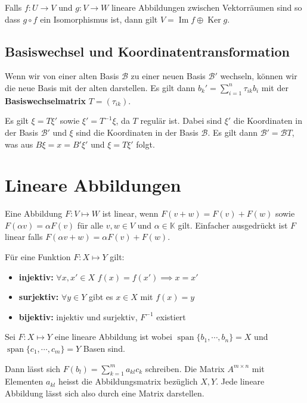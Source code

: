 \documentclass[a4paper,10pt]{article}
\DeclareMathOperator{\Span}{span}
\def\K{\mathbb{K}}
\begin{document}
Falls  $f: U \rightarrow V$ und $g: V \rightarrow W$ lineare Abbildungen zwischen Vektorräumen sind so dass $ g \circ f$ ein Isomorphismus ist, dann gilt $V = \operatorname{Im}f \oplus \operatorname{Ker} g$.

\subsection{Basiswechsel und Koordinatentransformation}

Wenn wir von einer alten Basis $\mathcal{B}$ zu einer neuen Basis $\mathcal{B}'$ wechseln, können wir die neue Basis mit der alten darstellen. Es gilt dann $b_k' = \sum_{i=1}^n \tau_{ik} b_i$ mit der \textbf{Basiswechselmatrix} $T = (\tau_{ik})$.

Es gilt $\xi = T \xi'$ sowie $\xi' = T^{-1} \xi$, da $T$ regulär ist. Dabei sind $\xi'$ die Koordinaten in der Basis $\mathcal{B}'$ und $\xi$ sind die Koordinaten in der Basis $\mathcal{B}$. Es gilt dann $\mathcal{B}' = \mathcal{B} T$, was aus $B \xi = x = B' \xi'$ und $\xi = T \xi'$ folgt.

\section{Lineare Abbildungen}

Eine Abbildung $F: V \mapsto W$ ist linear, wenn $F(v + w) = F(v) + F(w)$ sowie $F(\alpha v) = \alpha F(v)$ für alle $v, w \in V$ und $\alpha \in \K$ gilt. Einfacher ausgedrückt ist $F$ linear falls $F(\alpha v + w) = \alpha F(v) + F(w)$. 

Für eine Funktion $F: X \mapsto Y$ gilt:
\begin{itemize}
  \item \textbf{injektiv:} $\forall x, x' \in X$ $f(x) = f(x') \implies x = x'$
  \item \textbf{surjektiv:} $\forall y \in Y$ gibt es $x \in X$ mit $f(x) = y$
  \item \textbf{bijektiv:} injektiv und surjektiv, $F^{-1}$ existiert
\end{itemize}

Sei $F: X \mapsto Y$ eine lineare Abbildung ist wobei $\Span \{ b_1, \cdots, b_n \} = X$ und $\Span \{ c_1, \cdots, c_m \} = Y$ Basen sind.

Dann lässt sich $F(b_l) = \sum_{k=1}^m a_{kl} c_k$ schreiben. Die Matrix $A^{m \times n}$ mit Elementen $a_{kl}$ heisst die Abbildungsmatrix bezüglich $X, Y$. Jede lineare Abbildung lässt sich also durch eine Matrix darstellen.
\end{document}
